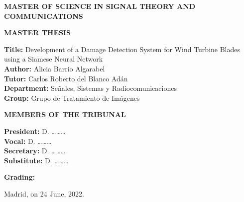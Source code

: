 \noindent\hspace*{\centeroffset}\begin{minipage}{\textwidth}
\colorbox{orange!90}{\parbox{\dimexpr\textwidth-2\fboxsep}{
     \begin{minipage}[c]{380px}
     \large
      \textbf{MASTER OF SCIENCE IN SIGNAL THEORY AND COMMUNICATIONS}
     \end{minipage}}}
     
\vspace{0.7cm}

\colorbox{orange!90}{\parbox{\dimexpr\textwidth-2\fboxsep}{
     \begin{minipage}[c]{380px}
     \large
      \textbf{MASTER THESIS}
     \end{minipage}}}

\vspace{0.5cm}
\textbf{Title:} {Development of a Damage Detection System for Wind Turbine Blades using a Siamese Neural Network}\\[0.2cm]
\textbf{Author:} {Alicia Barrio Algarabel}\\[0.2cm]
\textbf{Tutor:}  {Carlos Roberto del Blanco Adán}\\[0.2cm]
\textbf{Department:} {Señales, Sistemas y Radiocomunicaciones}\\[0.2cm]
\textbf{Group:} {Grupo de Tratamiento de Imágenes}\\

\vspace{0.7cm}
\colorbox{orange!90}{\parbox{\dimexpr\textwidth-2\fboxsep}{
     \begin{minipage}[c]{380px}
     \large
      \textbf{MEMBERS OF THE TRIBUNAL}
     \end{minipage}}}

\vspace{0.5cm}

\textbf{President:} {D. \dots\dots\dots}\\[0.2cm]
\textbf{Vocal:} {D. \dots\dots\dots}\\[0.2cm]
\textbf{Secretary:}  {D. \dots\dots\dots}\\[0.2cm]
\textbf{Substitute:} {D. \dots\dots\dots}\\

\vspace{0.7cm}

\textbf{Grading:}

\vspace{5cm}

\hspace{8cm} Madrid, on 24 June, 2022.

\end{minipage}

